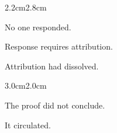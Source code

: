 \vspace{1em}

\begin{center}
\end{center}

\vspace{1em}

\begin{center}
\end{center}

\vspace{3em}

\vspace{5em}

\begin{center}
\end{center}

\vspace{5em}

\begin{adjustwidth}{2.2cm}{2.8cm}

No one responded.

\medskip

Response requires attribution.

\medskip

Attribution had dissolved.

\vspace{3em}

\end{adjustwidth}

\begin{center}

\smallskip


\smallskip

\end{center}

\vspace{3em}

\begin{adjustwidth}{3.0cm}{2.0cm}

The proof did not conclude.

\medskip

It circulated.

\vspace{3em}

\end{adjustwidth}

